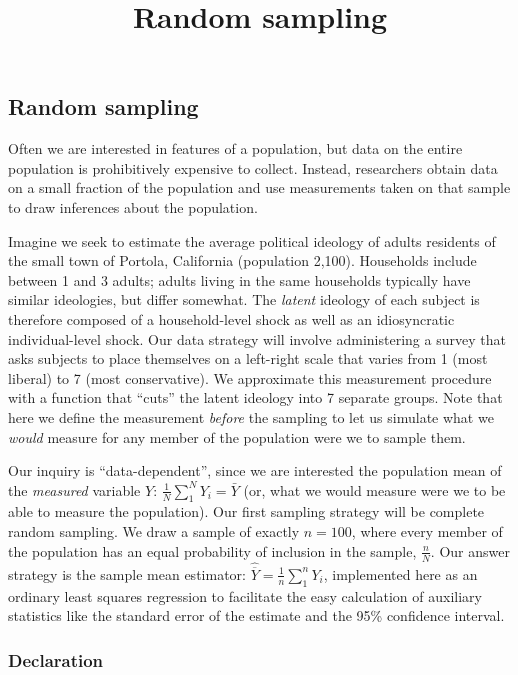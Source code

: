 \documentclass[
]{article}
\title{Random sampling}
\author{}
\date{\vspace{-2.5em}}
\begin{document}
\maketitle

\hypertarget{random-sampling}{%
\subsection{Random sampling}\label{random-sampling}}

Often we are interested in features of a population, but data on the
entire population is prohibitively expensive to collect. Instead,
researchers obtain data on a small fraction of the population and use
measurements taken on that sample to draw inferences about the
population.

Imagine we seek to estimate the average political ideology of adults
residents of the small town of Portola, California (population 2,100).
Households include between 1 and 3 adults; adults living in the same
households typically have similar ideologies, but differ somewhat. The
\emph{latent} ideology of each subject is therefore composed of a
household-level shock as well as an idiosyncratic individual-level
shock. Our data strategy will involve administering a survey that asks
subjects to place themselves on a left-right scale that varies from 1
(most liberal) to 7 (most conservative). We approximate this measurement
procedure with a function that ``cuts'' the latent ideology into 7
separate groups. Note that here we define the measurement \emph{before}
the sampling to let us simulate what we \emph{would} measure for any
member of the population were we to sample them.

Our inquiry is ``data-dependent'', since we are interested the
population mean of the \emph{measured} variable \(Y\):
\(\frac{1}{N} \sum_1^N Y_i = \bar{Y}\) (or, what we would measure were
we to be able to measure the population). Our first sampling strategy
will be complete random sampling. We draw a sample of exactly
\(n = 100\), where every member of the population has an equal
probability of inclusion in the sample, \(\frac{n}{N}\). Our answer
strategy is the sample mean estimator:
\(\widehat{\overline{Y}} = \frac{1}{n} \sum_1^n Y_i\), implemented here
as an ordinary least squares regression to facilitate the easy
calculation of auxiliary statistics like the standard error of the
estimate and the 95\% confidence interval.

\hypertarget{declaration}{%
\subsubsection{Declaration}\label{declaration}}
\end{document}
